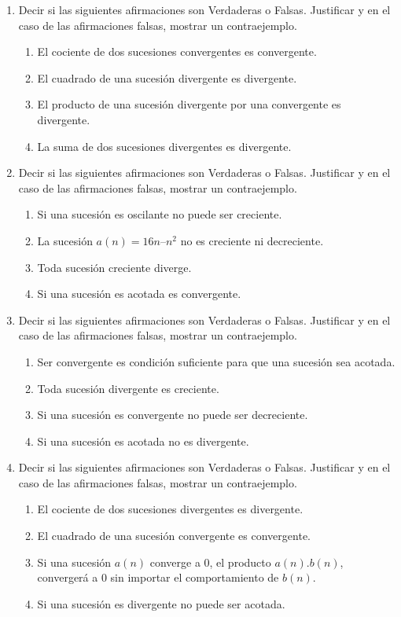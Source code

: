 \documentclass[12pt]{article}
\theoremstyle{definition}
\begin{document}
\begin{enumerate}

\item  
Decir si las siguientes afirmaciones son Verdaderas  o Falsas. Justificar y en el caso de las afirmaciones falsas, mostrar un contraejemplo.

 \begin{enumerate}
        \item El cociente de dos sucesiones convergentes es convergente.
        \item El cuadrado de una sucesión divergente es divergente.
        \item El producto de una sucesión divergente por una convergente es divergente.
        \item La suma de dos sucesiones divergentes es divergente.
\end{enumerate}

\item  
Decir si las siguientes afirmaciones son Verdaderas  o Falsas. Justificar y en el caso de las afirmaciones falsas, mostrar un contraejemplo.

\begin{enumerate}
	\item Si una sucesión es oscilante no puede ser creciente.
	\item La sucesión $a(n) = 16n – n^2$ no es creciente ni decreciente.
	\item Toda sucesión creciente diverge.
	\item Si una sucesión es acotada es convergente.
\end{enumerate}

\item  
Decir si las siguientes afirmaciones son Verdaderas  o Falsas. Justificar y en el caso de las afirmaciones falsas, mostrar un contraejemplo.

\begin{enumerate}
	\item Ser convergente es condición suficiente para que una sucesión sea acotada.
	\item Toda sucesión divergente es creciente.
	\item Si una sucesión es convergente no puede ser decreciente.
	\item Si una sucesión es acotada no es divergente.
\end{enumerate}

\item  
Decir si las siguientes afirmaciones son Verdaderas  o Falsas. Justificar y en el caso de las afirmaciones falsas, mostrar un contraejemplo.

\begin{enumerate}
	\item El cociente de dos sucesiones divergentes es divergente.
	\item El cuadrado de una sucesión convergente es convergente.
	\item Si una sucesión $a(n)$ converge a $0$, el producto $a(n).b(n)$, convergerá a $0$ sin importar el  comportamiento de $b(n)$.
	\item Si una sucesión es divergente no puede ser acotada.
\end{enumerate}
\end{enumerate}
\end{document}
